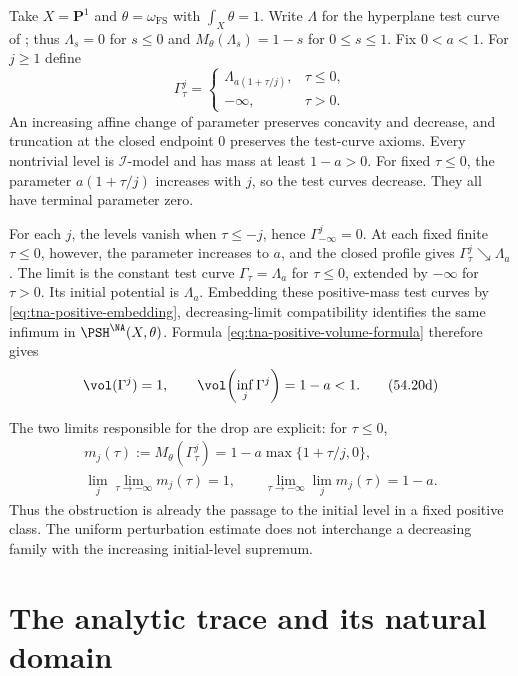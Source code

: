 \begin{example}\label{ex:operations-decreasing-volume-drop}
Take $X=\mathbf P^1$ and $\theta=\omega_{\mathrm{FS}}$ with
$\int_X\theta=1$.
Write $\Lambda$ for the hyperplane test curve of
; thus
$\Lambda_s=0$ for $s\leq0$ and
$M_\theta(\Lambda_s)=1-s$ for $0\leq s\leq1$.
Fix $0<a<1$.
For $j\geq1$ define
\[
 \Gamma^j_\tau=
 \begin{cases}
   \Lambda_{a(1+\tau/j)},&\tau\leq0,\\
   -\infty,&\tau>0.
 \end{cases}
\tag{54.20c}\label{eq:operations-volume-drop-curves}
\]
An increasing affine change of parameter preserves concavity
and decrease, and truncation at the closed endpoint $0$
preserves the test-curve axioms.
Every nontrivial level is $\mathcal I$-model and has mass at least
$1-a>0$.
For fixed $\tau\leq0$, the parameter $a(1+\tau/j)$ increases
with $j$, so the test curves decrease.
They all have terminal parameter zero.

For each $j$, the levels vanish when $\tau\leq-j$, hence
$\Gamma^j_{-\infty}=0$.
At each fixed finite $\tau\leq0$, however, the parameter
increases to $a$, and the closed profile gives
$\Gamma^j_\tau\searrow\Lambda_a$.
The limit is the constant test curve $\Gamma_\tau=\Lambda_a$
for $\tau\leq0$, extended by $-\infty$ for $\tau>0$.
Its initial potential is $\Lambda_a$.
Embedding these positive-mass test curves by
\eqref{eq:tna-positive-embedding}, decreasing-limit compatibility
identifies the same infimum in $\PSH^{\NA}(X,\theta)$.
Formula \eqref{eq:tna-positive-volume-formula} therefore gives
\[
 \vol(\Gamma^j)=1,\qquad
 \vol\!\left(\inf_j\Gamma^j\right)=1-a<1.
\tag{54.20d}\label{eq:operations-strict-volume-drop}
\]

The two limits responsible for the drop are explicit:
for $\tau\leq0$,
\[
 \begin{gathered}
 m_j(\tau):=M_\theta(\Gamma^j_\tau)
       =1-a\max\{1+\tau/j,0\},\\
 \lim_j\lim_{\tau\to-\infty}m_j(\tau)=1,\qquad
 \lim_{\tau\to-\infty}\lim_jm_j(\tau)=1-a.
 \end{gathered}
\]
Thus the obstruction is already the passage to the initial
level in a fixed positive class.
The uniform perturbation estimate does not interchange a
decreasing family with the increasing initial-level supremum.
\end{example}


\section{The analytic trace and its natural domain}
\label{sec:operations-analytic-trace}

